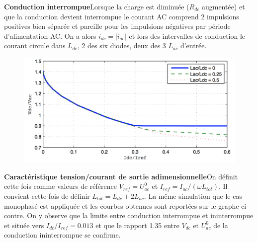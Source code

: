 		\textbf{Conduction interrompue}\qquad Lorsque la charge est diminuée ($R_{dc}$ augmentée) et que la conduction devient interrompue le courant AC comprend 2 impulsions positives bien séparée et pareille pour les impulsions négatives par période d'alimentation AC. On a alors $i_{dc} = |i_{ac}|$ et lors des intervalles de conduction le courant circule dans $L_{dc}$, 2 des six diodes, deux des 3 $L_{ac}$ d'entrée. \\
		
		\begin{figure}
		\vspace{-5mm}
		\includegraphics[scale=0.3]{ch2/17}
		\end{figure} 
		\textbf{Caractéristique tension/courant de sortie adimensionnelle}\qquad 		 On définit cette fois comme valeurs de référence $V_{ref} = U_{ac}^0$ et $I_{ref} = I_{ac}/(\omega L_{tot})$. Il convient cette fois de définir $L_{tot} = L_{dc}+ 2L_{ac}$. La même simulation que le cas monophasé est appliquée et les courbes obtenues sont reportées sur le graphe ci-contre. On y observe que la limite entre conduction interrompue et ininterrompue et située vers $I_{dc}/I_{ref} = 0.013$ et que le rapport 1.35 entre $V_{dc}$ et $U_{ac}^0$ de la conduction ininterrompue se confirme.
